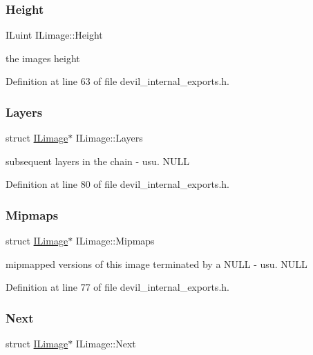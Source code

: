 \subsubsection{\texorpdfstring{Height}{Height}}
{\footnotesize\ttfamily I\+Luint I\+Limage\+::\+Height}



the image\textquotesingle{}s height 



Definition at line 63 of file devil\+\_\+internal\+\_\+exports.\+h.

\mbox{\label{structILimage_a504d31f6b9c9d6da656f5eecb57bdd46}} 
\subsubsection{\texorpdfstring{Layers}{Layers}}
{\footnotesize\ttfamily struct \hyperlink{structILimage}{I\+Limage}$\ast$ I\+Limage\+::\+Layers}



subsequent layers in the chain -\/ usu. N\+U\+LL 



Definition at line 80 of file devil\+\_\+internal\+\_\+exports.\+h.

\mbox{\label{structILimage_afa2c8bedcd1178760327302911969035}} 
\subsubsection{\texorpdfstring{Mipmaps}{Mipmaps}}
{\footnotesize\ttfamily struct \hyperlink{structILimage}{I\+Limage}$\ast$ I\+Limage\+::\+Mipmaps}



mipmapped versions of this image terminated by a N\+U\+LL -\/ usu. N\+U\+LL 



Definition at line 77 of file devil\+\_\+internal\+\_\+exports.\+h.

\mbox{\label{structILimage_adbd033e6e25af697caa549be3deeb5ff}} 
\subsubsection{\texorpdfstring{Next}{Next}}
{\footnotesize\ttfamily struct \hyperlink{structILimage}{I\+Limage}$\ast$ I\+Limage\+::\+Next}



